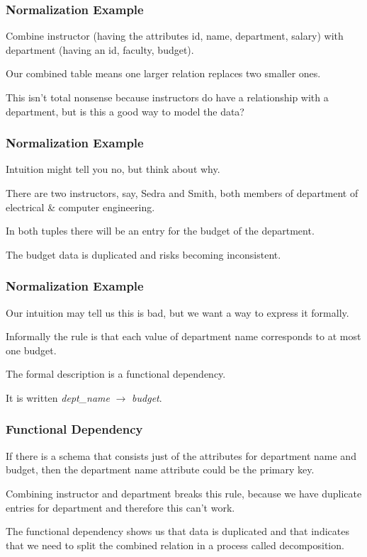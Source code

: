 \begin{frame}
\frametitle{Normalization Example}

Combine instructor (having the attributes id, name, department, salary) with department (having an id, faculty, budget).

Our combined table means one larger relation replaces two smaller ones.

This isn't total nonsense because instructors do have a relationship with a department, but is this a good way to model the data?

\end{frame}



\begin{frame}
\frametitle{Normalization Example}

Intuition might tell you no, but think about why. 

There are two instructors, say, Sedra and Smith, both members of department of electrical \& computer engineering. 

In both tuples there will be an entry for the budget of the department. 

The budget data is duplicated and risks becoming inconsistent.

\end{frame}

\begin{frame}
\frametitle{Normalization Example}

Our intuition may tell us this is bad, but we want a way to express it formally. 

Informally the rule is that each value of department name corresponds to at most one budget. 

The formal description is a \alert{functional dependency}. 

It is written \textit{dept\_name} $\rightarrow$ \textit{budget}. 


\end{frame}



\begin{frame}
\frametitle{Functional Dependency}

If there is a schema that consists just of the attributes for department name and budget, then the department name attribute could be the primary key.

Combining instructor and department breaks this rule, because we have duplicate entries for department and therefore this can't work.

The functional dependency shows us that data is duplicated and that indicates that we need to split the combined relation in a process called \alert{decomposition}.

\end{frame}



